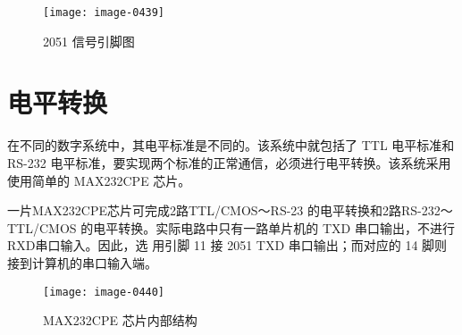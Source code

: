 \newpage
\begin{figure}[htbp]
  \centering
  \texttt{[image: image-0439]}
  \caption{2051 信号引脚图}
  \label{4-9}
\end{figure}

\section{电平转换}

在不同的数字系统中，其电平标准是不同的。该系统中就包括了 TTL 电平标准和 RS-232 
电平标准，要实现两个标准的正常通信，必须进行电平转换。该系统采用使用简单的 
MAX232CPE 芯片。

一片MAX232CPE芯片可完成2路TTL/CMOS～RS-23 的电平转换和2路RS-232～TTL/CMOS
的电平转换。实际电路中只有一路单片机的 TXD 串口输出，不进行RXD串口输入。因此，选
用引脚 11 接 2051 TXD 串口输出；而对应的 14 脚则接到计算机的串口输入端。

\begin{figure}[htbp]
  \centering
  \texttt{[image: image-0440]}
  \caption{MAX232CPE 芯片内部结构}
  \label{4-10}
\end{figure}
